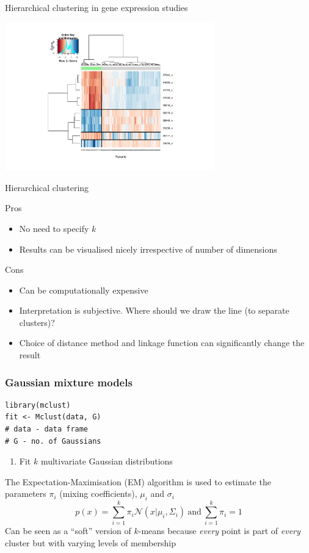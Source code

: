 \documentclass[pdf]{beamer}
\begin{document}
\begin{frame}{Hierarchical clustering in gene expression studies}
\begin{center}
	\includegraphics[width=0.68\textwidth]{geneExpression.pdf}
\end{center}
\end{frame}
\begin{frame}{Hierarchical clustering}
\begin{exampleblock}{Pros}
\begin{itemize}
	\item No need to specify $k$
	\item Results can be visualised nicely irrespective of number of dimensions 
\end{itemize}
\end{exampleblock}
\vfill
\begin{alertblock}{Cons}
\begin{itemize}
	\item Can be computationally expensive
	\item Interpretation is subjective. Where should we draw the line (to separate clusters)?
	\item Choice of distance method and linkage function can significantly change the result 
\end{itemize}
\end{alertblock}
\end{frame}
\begin{frame}[fragile]
\frametitle{Gaussian mixture models}
\begin{lstlisting}[style=RCode]
library(mclust)
fit <- Mclust(data, G)
# data - data frame 
# G - no. of Gaussians
\end{lstlisting}
\begin{enumerate}
	\item Fit $k$ multivariate Gaussian distributions
\end{enumerate}
\vfill
The Expectation-Maximisation (EM) algorithm is used to estimate the parameters $\pi_i$ (mixing coefficients), $\mu_i$ and $\sigma_i$
$$
p(x) = \sum_{i=1}^k \pi_i \mathcal{N}(x|\mu_i, \Sigma_i)\ \mathrm{and}\ \sum_{i=1}^k \pi_i = 1
$$
Can be seen as a ``soft'' version of $k$-means because \textit{every} point is part of \textit{every} cluster but
with varying levels of membership
\end{frame}
\end{document}
